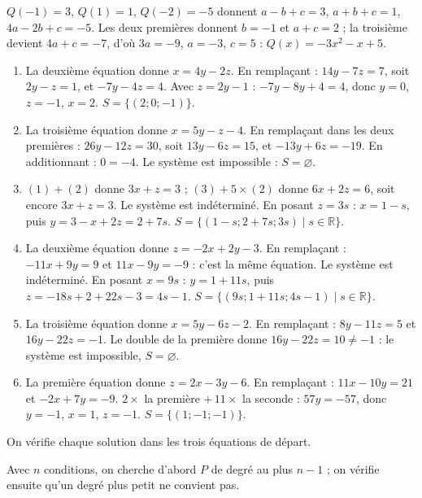 \begin{corrige}
\begin{sol}
$Q(-1) = 3$, $Q(1) = 1$, $Q(-2) = -5$ donnent $a - b + c = 3$, $a + b + c = 1$, $4a - 2b + c = -5$.
Les deux premi\`eres donnent $b = -1$ et $a + c = 2$ ; la troisi\`eme devient $4a + c = -7$, d'o\`u $3a = -9$, $a = -3$, $c = 5$ :
$\boxed{Q(x) = -3x^2 - x + 5}$.
\end{sol}
%
\begin{sol}
\begin{enumerate}
\item La deuxi\`eme \'equation donne $x = 4y - 2z$. En rempla\c{c}ant : $14y - 7z = 7$, soit $2y - z = 1$, et $-7y - 4z = 4$.
      Avec $z = 2y - 1$ : $-7y - 8y + 4 = 4$, donc $y = 0$, $z = -1$, $x = 2$.
      $S = \{ (2 ; 0 ; -1) \}$.
\item La troisi\`eme \'equation donne $x = 5y - z - 4$. En rempla\c{c}ant dans les deux premi\`eres :
      $26y - 12z = 30$, soit $13y - 6z = 15$, et $-13y + 6z = -19$.
      En additionnant : $0 = -4$. Le syst\`eme est impossible : $S = \varnothing$.
\item $(1) + (2)$ donne $3x + z = 3$ ; $(3) + 5 \times (2)$ donne $6x + 2z = 6$, soit encore $3x + z = 3$.
      Le syst\`eme est ind\'etermin\'e. En posant $z = 3s$ : $x = 1 - s$, puis $y = 3 - x + 2z = 2 + 7s$.
      $S = \{ (1 - s ; 2 + 7s ; 3s) \mid s \in \mathbb{R} \}$.
\item La deuxi\`eme \'equation donne $z = -2x + 2y - 3$. En rempla\c{c}ant : $-11x + 9y = 9$ et $11x - 9y = -9$ : c'est la m\^eme \'equation.
      Le syst\`eme est ind\'etermin\'e. En posant $x = 9s$ : $y = 1 + 11s$, puis $z = -18s + 2 + 22s - 3 = 4s - 1$.
      $S = \{ (9s ; 1 + 11s ; 4s - 1) \mid s \in \mathbb{R} \}$.
\item La troisi\`eme \'equation donne $x = 5y - 6z - 2$. En rempla\c{c}ant : $8y - 11z = 5$ et $16y - 22z = -1$.
      Le double de la premi\`ere donne $16y - 22z = 10 \neq -1$ : le syst\`eme est impossible, $S = \varnothing$.
\item La premi\`ere \'equation donne $z = 2x - 3y - 6$. En rempla\c{c}ant : $11x - 10y = 21$ et $-2x + 7y = -9$.
      $2 \times$ la premi\`ere $+ \, 11 \times$ la seconde : $57y = -57$, donc $y = -1$, $x = 1$, $z = -1$.
      $S = \{ (1 ; -1 ; -1) \}$.
\end{enumerate}
On v\'erifie chaque solution dans les trois \'equations de d\'epart.
\end{sol}
%
\begin{sol}
Avec $n$ conditions, on cherche d'abord $P$ de degr\'e au plus $n - 1$ ; on v\'erifie ensuite qu'un degr\'e plus petit ne convient pas.

\end{sol}
\end{corrige}

